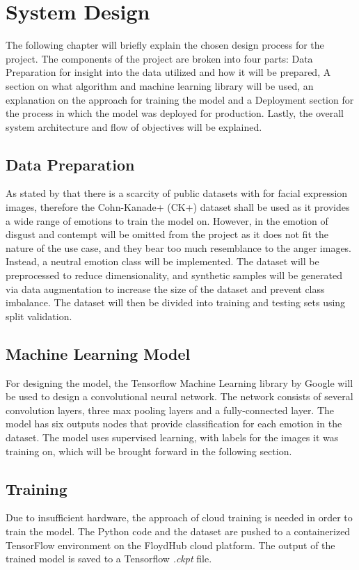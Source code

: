 \chapter{System Design}
The following chapter will briefly explain the chosen design process for the project. The components of the project are broken into four parts: Data Preparation for insight into the data utilized and how it will be prepared, A section on what algorithm and machine learning library will be used, an explanation on the approach for training the model and a Deployment section for the process in which the model was deployed for production. Lastly, the overall system architecture and flow of objectives will be explained.

\section{Data Preparation}
As stated by \citeauthor*{LOPES} that there is a scarcity of public datasets with for facial expression images, therefore the Cohn-Kanade+ (CK+) dataset shall be used as it provides a wide range of emotions to train the model on. However, in the emotion of disgust and contempt will be omitted from the project as it does not fit the nature of the use case, and they bear too much resemblance to the anger images. Instead, a neutral emotion class will be implemented.
The dataset will be preprocessed to reduce dimensionality, and synthetic samples will be generated via data augmentation to increase the size of the dataset and prevent class imbalance. The dataset will then be divided into training and testing sets using split validation. 

\section{Machine Learning Model}
For designing the model, the Tensorflow Machine Learning library by Google will be used to design a convolutional neural network. 
The network consists of several convolution layers, three max pooling layers and a fully-connected layer. The model has six outputs nodes that provide classification for each emotion in the dataset. The model uses supervised learning, with labels for the images it was training on, which will be brought forward in the following section.\\

\section{Training}
Due to insufficient hardware, the approach of cloud training is needed in order to train the model. The Python code and the dataset are pushed to a containerized TensorFlow environment on the FloydHub cloud platform. The output of the trained model is saved to a Tensorflow \textit{.ckpt} file.

